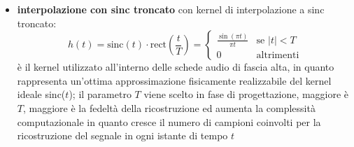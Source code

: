 \begin{itemize}
	\item \textbf{interpolazione con sinc troncato} con kernel di interpolazione a sinc troncato:
	\[h(t) = \text{sinc}(t) \cdot \text{rect}\!\left(\frac{t}{T}\right) = \begin{cases}
		\frac{\sin(\pi t)}{\pi t} & \text{se } |t| < T \\
		0 & \text{altrimenti}
	\end{cases}\]
	è il kernel utilizzato all'interno delle schede audio di fascia alta, in quanto rappresenta un'ottima approssimazione
	fisicamente realizzabile del kernel ideale sinc(\(t\)); il parametro \(T\) viene scelto in fase di progettazione,
	maggiore è \(T\), maggiore è la fedeltà della ricostruzione ed aumenta la complessità computazionale in quanto cresce
	il numero di campioni coinvolti per la ricostruzione del segnale in ogni istante di tempo \(t\)
\end{itemize}
